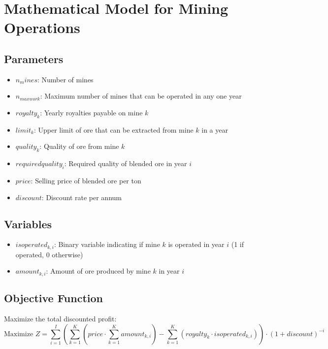 \documentclass{article}
\begin{document}
\section*{Mathematical Model for Mining Operations}

\subsection*{Parameters}
\begin{itemize}
    \item $n_mines$: Number of mines
    \item $n_{maxwork}$: Maximum number of mines that can be operated in any one year
    \item $royalty_k$: Yearly royalties payable on mine $k$
    \item $limit_k$: Upper limit of ore that can be extracted from mine $k$ in a year
    \item $quality_k$: Quality of ore from mine $k$
    \item $requiredquality_i$: Required quality of blended ore in year $i$
    \item $price$: Selling price of blended ore per ton
    \item $discount$: Discount rate per annum
\end{itemize}

\subsection*{Variables}
\begin{itemize}
    \item $isoperated_{k,i}$: Binary variable indicating if mine $k$ is operated in year $i$ (1 if operated, 0 otherwise)
    \item $amount_{k,i}$: Amount of ore produced by mine $k$ in year $i$
\end{itemize}

\subsection*{Objective Function}
Maximize the total discounted profit:
\[
\text{Maximize } Z = \sum_{i=1}^{I} \left( \sum_{k=1}^{K} (price \cdot \sum_{k=1}^{K} amount_{k,i}) - \sum_{k=1}^{K} (royalty_k \cdot isoperated_{k,i}) \right) \cdot (1 + discount)^{-i}
\]
\end{document}
